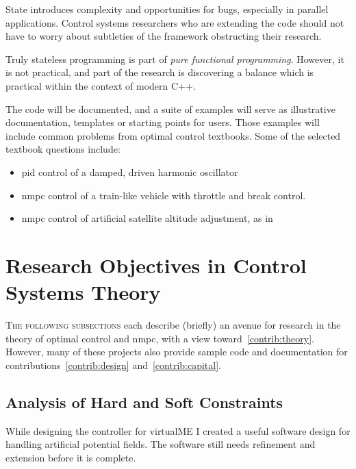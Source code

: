 \begin{description}
  State introduces complexity and opportunities for bugs, especially in parallel
  applications. Control systems researchers who are extending the code should
  not have to worry about subtleties of the framework obstructing their
  research.

  Truly stateless programming is part of \emph{pure functional programming}.
  However, it is not practical, and part of the research is discovering a
  balance which is practical within the context of modern C++.
\end{description}

The code will be documented, and a suite of examples will serve as illustrative
documentation, templates or starting points for users. Those examples will
include common problems from optimal control textbooks. Some of the selected
textbook questions include:
%
\begin{itemize}
  \item \ac{pid} control of a damped, driven harmonic oscillator
  \item \ac{nmpc} control of a train-like vehicle with throttle and break control.~\cite[p.~5]{Kirk2004}
  \item \ac{nmpc} control of artificial satellite altitude adjustment, as in~\cite[p.~1]{Vinter2010}
\end{itemize}



\section{Research Objectives in Control Systems Theory}%
\label{sec:ObjectivesForControlSystemsTheory}


\textsc{The following subsections} each describe (briefly) an avenue for
research in the theory of optimal control and \ac{nmpc}, with a view
toward~\ref{contrib:theory}. However, many of these projects also provide sample
code and documentation for contributions~\ref{contrib:design}
and~\ref{contrib:capital}.


\subsection{Analysis of Hard and Soft Constraints}

While designing the controller for virtualME I created a useful
software design for handling artificial potential fields. The software still
needs refinement and extension before it is complete.

